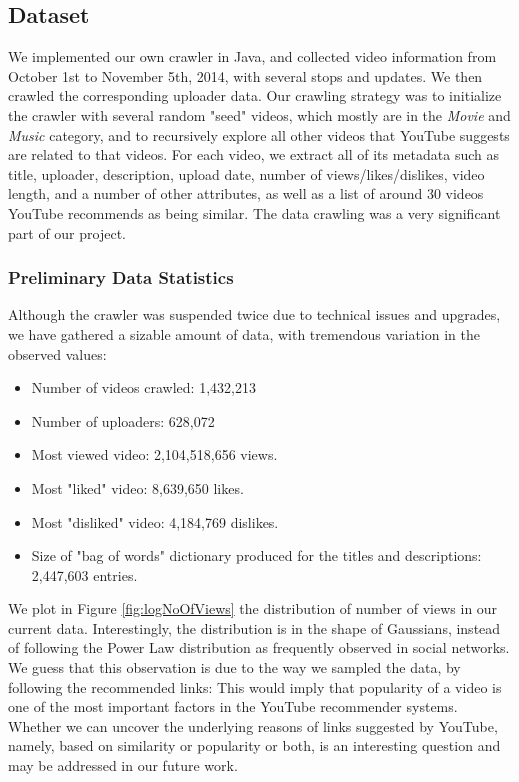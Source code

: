 \subsection{Dataset}
	We implemented our own crawler in Java, and collected video information from October 1st to November 5th, 2014, with several stops and updates.  We then crawled the corresponding uploader data. Our crawling strategy was to initialize the crawler with several random "seed" videos, which mostly are in the \textit{Movie} and \textit{Music} category, and to recursively explore all other videos that YouTube suggests are related to that videos. For each video, we extract all of its metadata such as title, uploader, description, upload date, number of views/likes/dislikes, video length, and a number of other attributes, as well as a list of around 30 videos YouTube recommends as being similar.  The data crawling was a very significant part of our project.

	\subsubsection{Preliminary Data Statistics}
		Although the crawler was suspended twice due to technical issues and upgrades, we have gathered a sizable amount of data, with tremendous  variation in the observed values:

		\begin{itemize}
			\item Number of videos crawled: 1,432,213
			\item Number of uploaders: 628,072
			\item Most viewed video: 2,104,518,656 views.
			\item Most "liked" video: 8,639,650 likes.
			\item Most "disliked" video: 4,184,769 dislikes.
			\item Size of "bag of words" dictionary produced for the titles and descriptions: 2,447,603 entries.
		\end{itemize}

		We plot in Figure \ref{fig:logNoOfViews} the distribution of number of views in our current data. Interestingly, the distribution is in the shape of Gaussians, instead of following the Power Law distribution as frequently observed in social networks. We guess that this observation is due to the way we sampled the data, by following the recommended links: This would imply that popularity of a video is one of the most important factors in the YouTube recommender systems. Whether we can uncover the underlying reasons of links suggested by YouTube, namely, based on similarity or popularity or both, is an interesting question and may be addressed in our future work.
		
